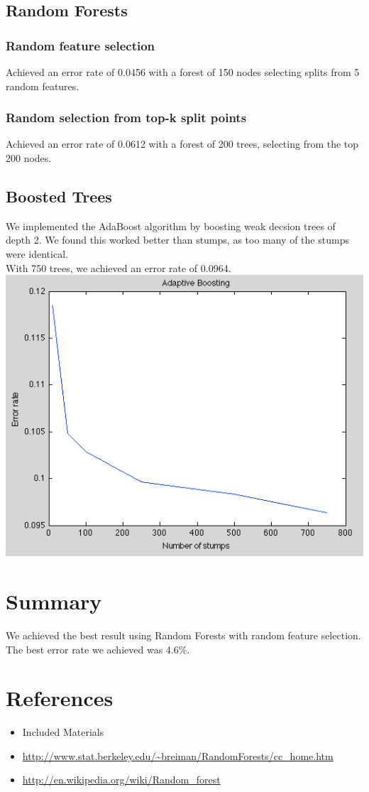 \documentclass[11pt,a4paper]{article}
\begin{document}
\subsection{Random Forests}
\subsubsection{Random feature selection}
Achieved an error rate of 0.0456 with a forest of 150 nodes selecting splits from 5 random features.

\subsubsection{Random selection from top-k split points}
Achieved an error rate of 0.0612 with a forest of 200 trees, selecting from the top 200 nodes.

\subsection{Boosted Trees}
We implemented the AdaBoost algorithm by boosting weak decsion trees of depth 2. We found this worked better than stumps, as too many of the stumps were identical. \\
With 750 trees, we achieved an error rate of 0.0964. \\
\includegraphics[width=\textwidth]{adaboost.png}

\section{Summary}
We achieved the best result using Random Forests with random feature selection. The best error rate we achieved was 4.6\%.

\section{References}
\begin{itemize}
\item Included Materials
\item \url{http://www.stat.berkeley.edu/~breiman/RandomForests/cc_home.htm}
\item \url{http://en.wikipedia.org/wiki/Random_forest}
\end{itemize}
\end{document}
